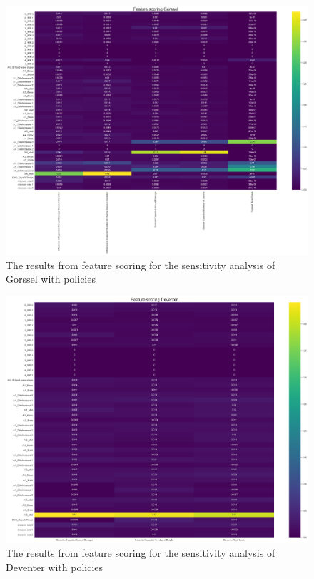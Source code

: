 \begin{figure}[h!]
    \centering
    \includegraphics[width=\textwidth]{report/figures/results/Feature_scoring_Gorssel_100scen.png}
    \caption{The results from feature scoring for the sensitivity analysis of Gorssel with policies}
    \label{fig:feat-scor-g}
\end{figure}

\begin{figure}[h!]
    \centering
    \includegraphics[width=\textwidth]{report/figures/results/Feature_scoring_Deventer_100scen.png}
    \caption{The results from feature scoring for the sensitivity analysis of Deventer with policies}
    \label{fig:feat-scor-d}
\end{figure}

